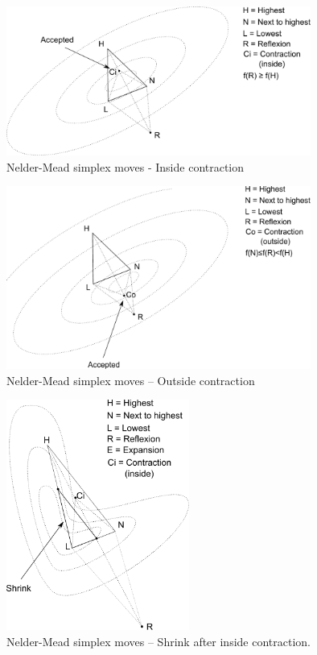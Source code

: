 \begin{figure}
\begin{center}
\includegraphics[width=10cm]{neldermeadmethod/nelder-mead-contract-inside.pdf}
\end{center}
\caption{Nelder-Mead simplex moves - Inside contraction}
\label{fig-nm-moves-insidecontraction}
\end{figure}

\begin{figure}
\begin{center}
\includegraphics[width=10cm]{neldermeadmethod/nelder-mead-contract-outside.pdf}
\end{center}
\caption{Nelder-Mead simplex moves -- Outside contraction}
\label{fig-nm-moves-outsidecontraction}
\end{figure}

\begin{figure}
\begin{center}
\includegraphics[width=6cm]{neldermeadmethod/nelder-mead-shrink-afterci.pdf}
\end{center}
\caption{Nelder-Mead simplex moves -- Shrink after inside contraction.}
\label{fig-nm-moves-shrinkafterci}
\end{figure}

